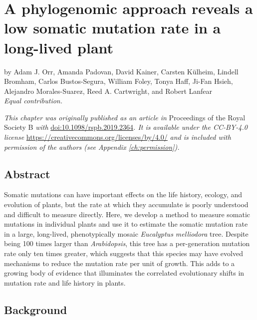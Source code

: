 \chapter{A phylogenomic approach reveals a low somatic mutation rate in a long-lived plant}
\label{ch:phylogenomic}

\parindent0pt by Adam J. Orr\textsuperscript{\dagger}, Amanda Padovan\textsuperscript{\dagger}, David Kainer\textsuperscript{\dagger}, Carsten Külheim, Lindell Bromham, Carlos Bustos-Segura, William Foley, Tonya Haff, Ji-Fan Hsieh, Alejandro Morales-Suarez, Reed A. Cartwright, and Robert Lanfear
\\
\hspace*{\fill}\textit{\dagger Equal contribution.}

\vspace{\baselineskip}

\textit{This chapter was originally published as an article in} Proceedings of the Royal Society B \textit{with }\url{doi:10.1098/rspb.2019.2364}\textit{. It is available under the CC-BY-4.0 license }\url{https://creativecommons.org/licenses/by/4.0/}\textit{ and is included with permission of the authors (see Appendix \ref{ch:permission}).}

\section{Abstract}
Somatic mutations can have important effects on the life history, ecology, and evolution of plants, but the rate at which they accumulate is poorly understood and difficult to measure directly. Here, we develop a method to measure somatic mutations in individual plants and use it to estimate the somatic mutation rate in a large, long-lived, phenotypically mosaic \textit{Eucalyptus melliodora} tree. Despite being 100 times larger than \textit{Arabidopsis}, this tree has a per-generation mutation rate only ten times greater, which suggests that this species may have evolved mechanisms to reduce the mutation rate per unit of growth. This adds to a growing body of evidence that illuminates the correlated evolutionary shifts in mutation rate and life history in plants.

\section{Background}

